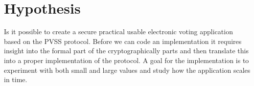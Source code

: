\section{Hypothesis}
Is it possible to create a secure practical usable electronic voting application based on the PVSS protocol. Before we can code an implementation it requires insight into the formal part of the cryptographically parts and then translate this into a proper implementation of the protocol. A goal for the implementation is to experiment with both small and large values and study how the application scales in time.


